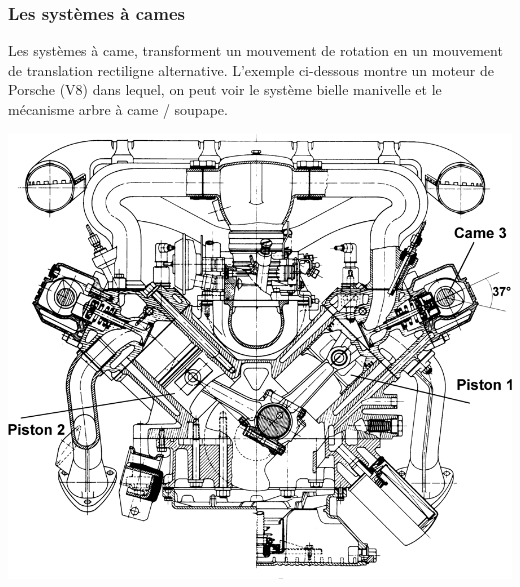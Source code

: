 \documentclass[11pt,oneside]{article}
\begin{document}
\subsubsection{Les systèmes à cames}

Les systèmes à came, transforment un mouvement de rotation en un mouvement de translation rectiligne alternative. L’exemple ci-dessous montre un moteur de Porsche (V8) dans lequel, on peut voir le système bielle manivelle et le mécanisme arbre à came / soupape. 

\begin{center}
\includegraphics[width=.95\textwidth]{png/fig_117}
\end{center}
\end{document}
